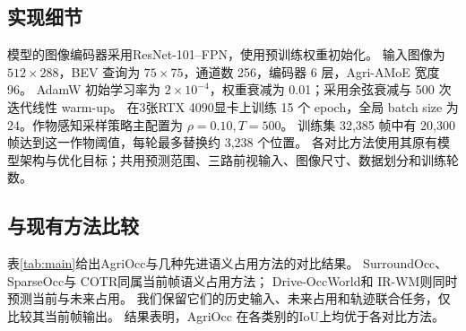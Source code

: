 \documentclass[a4paper,fleqn]{cas-sc}
\begin{document}
\subsection{实现细节}\label{sec:implementation}
模型的图像编码器采用ResNet-101--FPN，使用预训练权重初始化。
输入图像为 $512\times288$，BEV 查询为 $75\times75$，通道数 256，编码器 6 层，Agri-AMoE 宽度 96。
AdamW 初始学习率为 $2\times10^{-4}$，权重衰减为 0.01；采用余弦衰减与 500 次迭代线性 warm-up。
在3张RTX 4090显卡上训练 15 个 epoch，全局 batch size 为 24。作物感知采样策略主配置为 $\rho=0.10,T=500$。
训练集 32,385 帧中有 20,300 帧达到这一作物阈值，每轮最多替换约 3,238 个位置。
各对比方法使用其原有模型架构与优化目标；共用预测范围、三路前视输入、图像尺寸、数据划分和训练轮数。

\subsection{与现有方法比较}\label{sec:comparison}
表\ref{tab:main}给出AgriOcc与几种先进语义占用方法的对比结果。
SurroundOcc\citep{wei2023surroundocc}、SparseOcc\citep{tang2024sparseocc}与 COTR\citep{ma2024cotr}同属当前帧语义占用方法；
Drive-OccWorld\citep{yangDrivingOccupancyWorld2025}和 IR-WM\citep{mei2025irwm}则同时预测当前与未来占用。
我们保留它们的历史输入、未来占用和轨迹联合任务，仅比较其当前帧输出。
结果表明，AgriOcc 在各类别的IoU上均优于各对比方法。

\begin{table}[pos=htbp]
\centering
\caption{AgriOcc-Dataset 上的三维语义占用性能。IoU 单位为 \%，推理耗时单位为 ms/帧.}
\label{tab:main}
\end{table}
 
\end{document}
